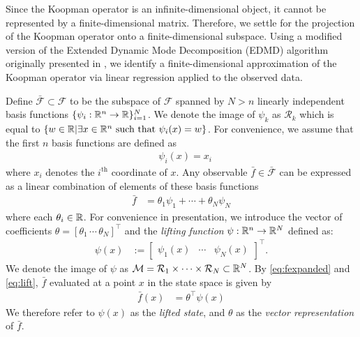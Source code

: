 Since the Koopman operator is an infinite-dimensional object, it cannot be represented by a finite-dimensional matrix. 
Therefore, we settle for the projection of the Koopman operator onto a finite-dimensional subspace.
Using a modified version of the Extended Dynamic Mode Decomposition (EDMD) algorithm \cite{williams2015data} originally presented in \cite{mauroy2016linear,mauroy2017koopman}, we identify a finite-dimensional approximation of the Koopman operator via linear regression applied to the observed data.

Define ${\bar{\mathcal{F}} \subset \mathcal{F}}$ to be the subspace of $\mathcal{F}$ spanned by ${N>n}$ linearly independent basis functions 
${ \{ \psi_i : \mathbb{R}^n \to \mathbb{R} \}_{i=1}^N}$.
We denote the image of $\psi_k$ as $ \mathcal{R}_k$ which is equal to $\{ w \in \mathbb{R} | \exists x \in \mathbb{R}^n \text{ such that } \psi_i(x) = w  \}$.
For convenience, we assume that the first $n$ basis functions are defined as
\begin{align}
    &\psi_i(x) = x_i
    \label{eq:xinpsi}
\end{align}
where $x_i$ denotes the $i^{\text{th}}$ coordinate of $x$.
Any observable $\bar{f} \in \bar{\mathcal{F}}$ can be expressed as a linear combination of elements of these basis functions
\begin{align}
    \bar{f} &= \theta_1 \psi_1 + \cdots + \theta_N \psi_N
    \label{eq:fexpanded}
\end{align}
where each $\theta_i \in \mathbb{R}$.
For convenience in presentation, we introduce the vector of coefficients ${\theta = [ \theta_1 \,  \cdots \, \theta_N ]^\top}$ and the \emph{lifting function} ${\psi : \mathbb{R}^n \to \mathbb{R}^N}$ defined as:
\begin{align}
    \psi(x) &:= \begin{bmatrix} \psi_1 (x) & \cdots & \psi_N (x) \end{bmatrix}^\top.
    \label{eq:lift}
\end{align}
We denote the image of $\psi$ as $\mathcal{M} = \mathcal{R}_1 \times \cdots \times \mathcal{R}_N \subset \mathbb{R}^N$.
By \eqref{eq:fexpanded} and \eqref{eq:lift}, $\bar{f}$ evaluated at a point $x$ in the state space is given by
\begin{align}
    \bar{f}(x) &= \theta^\top \psi (x)
    \label{eq:fvec}
\end{align}
We therefore refer to $\psi(x)$ as the \emph{lifted state}, and $\theta$ as the \emph{vector representation} of $\bar{f}$.

